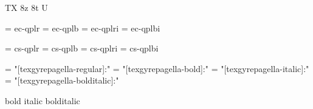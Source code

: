 
\ifx\ffdecl\undefined  \fi

\ffdecl [TG Pagella] {\caps} {\rm \bf \it \bi} {} {TX} {8z 8t U}

\def\caps{\ffsetV{caps}{-sc}\ffsetX}  \def\nocaps{\ffsetV{caps}{}\ffsetX}
\def\capsV{} 

\ismacro{}\ifttrue

   \font\tenrm = ec-qplr  \sizespec
   \font\tenbf = ec-qplb  \sizespec
   \font\tenit = ec-qplri \sizespec
   \font\tenbi = ec-qplbi \sizespec

   \def\ffnamegen{ec-qpl\ffvarV\capsV}

\fi

\ismacro{}\iftrue

   \font\tenrm = cs-qplr  \sizespec
   \font\tenbf = cs-qplb  \sizespec
   \font\tenit = cs-qplri \sizespec
   \font\tenbi = cs-qplbi \sizespec

   \def\ffnamegen{cs-qpl\ffvarV\capsV}
   

\fi

\ismacro{}\iftrue

   \font\tenrm = "[texgyrepagella-regular]:\fontfeatures"    \sizespec
   \font\tenbf = "[texgyrepagella-bold]:\fontfeatures"       \sizespec
   \font\tenit = "[texgyrepagella-italic]:\fontfeatures"     \sizespec
   \font\tenbi = "[texgyrepagella-bolditalic]:\fontfeatures" \sizespec

   \def\ffnamegen{"[texgyrepagella-\ffvarV]:\capsV\fontfeatures"} 

    {bold} {italic} {bolditalic}
   \def\caps{\ffsetV{caps}{+smcp;}\ffsetX}

\fi
\tenrm %

\ifx\loadmathfonts\relax \endinput \fi
\ifx\mathpreloaded X\else  \fi                     

\endinput
